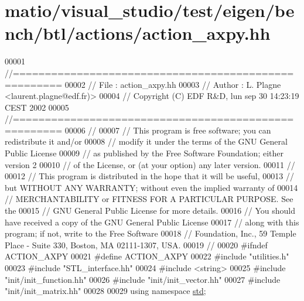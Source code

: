 \hypertarget{matio_2visual__studio_2test_2eigen_2bench_2btl_2actions_2action__axpy_8hh_source}{}\section{matio/visual\+\_\+studio/test/eigen/bench/btl/actions/action\+\_\+axpy.hh}
\label{matio_2visual__studio_2test_2eigen_2bench_2btl_2actions_2action__axpy_8hh_source}

\begin{DoxyCode}
00001 \textcolor{comment}{//=====================================================}
00002 \textcolor{comment}{// File   :  action\_axpy.hh}
00003 \textcolor{comment}{// Author :  L. Plagne <laurent.plagne@edf.fr)>}
00004 \textcolor{comment}{// Copyright (C) EDF R&D,  lun sep 30 14:23:19 CEST 2002}
00005 \textcolor{comment}{//=====================================================}
00006 \textcolor{comment}{//}
00007 \textcolor{comment}{// This program is free software; you can redistribute it and/or}
00008 \textcolor{comment}{// modify it under the terms of the GNU General Public License}
00009 \textcolor{comment}{// as published by the Free Software Foundation; either version 2}
00010 \textcolor{comment}{// of the License, or (at your option) any later version.}
00011 \textcolor{comment}{//}
00012 \textcolor{comment}{// This program is distributed in the hope that it will be useful,}
00013 \textcolor{comment}{// but WITHOUT ANY WARRANTY; without even the implied warranty of}
00014 \textcolor{comment}{// MERCHANTABILITY or FITNESS FOR A PARTICULAR PURPOSE.  See the}
00015 \textcolor{comment}{// GNU General Public License for more details.}
00016 \textcolor{comment}{// You should have received a copy of the GNU General Public License}
00017 \textcolor{comment}{// along with this program; if not, write to the Free Software}
00018 \textcolor{comment}{// Foundation, Inc., 59 Temple Place - Suite 330, Boston, MA  02111-1307, USA.}
00019 \textcolor{comment}{//}
00020 \textcolor{preprocessor}{#ifndef ACTION\_AXPY}
00021 \textcolor{preprocessor}{#define ACTION\_AXPY}
00022 \textcolor{preprocessor}{#include "utilities.h"}
00023 \textcolor{preprocessor}{#include "STL\_interface.hh"}
00024 \textcolor{preprocessor}{#include <string>}
00025 \textcolor{preprocessor}{#include "init/init\_function.hh"}
00026 \textcolor{preprocessor}{#include "init/init\_vector.hh"}
00027 \textcolor{preprocessor}{#include "init/init\_matrix.hh"}
00028 
00029 \textcolor{keyword}{using namespace }\hyperlink{namespacestd}{std};

\end{DoxyCode}
